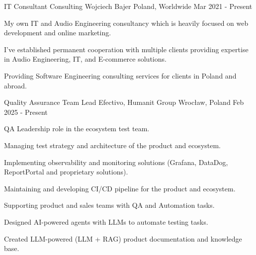 
\begin{cventries}

  \cventry
  {IT Consultant} %
  {Consulting Wojciech Bajer} %
  {Poland, Worldwide} %
  {Mar 2021 - Present} %
  {
    \begin{cvitems} %
      \item {My own IT and Audio Engineering consultancy which is heavily focused on web development and online marketing.}
      \item {I've established permanent cooperation with multiple clients providing expertise in Audio Engineering, IT, and E-commerce solutions.}
      \item {Providing Software Engineering consulting services for clients in Poland and abroad.}
    \end{cvitems}
  }

  \cventry
  {Quality Assurance Team Lead} %
  {Efectivo, Humanit Group} %
  {Wrocław, Poland} %
  {Feb 2025 - Present} %
  {
    \begin{cvitems}
      \item {QA Leadership role in the ecosystem test team.}
      \item {Managing test strategy and architecture of the product and ecosystem.}
      \item {Implementing observability and monitoring solutions (Grafana, DataDog, ReportPortal and proprietary solutions).}
      \item {Maintaining and developing CI/CD pipeline for the product and ecosystem.}
      \item {Supporting product and sales teams with QA and Automation tasks.}
      \item {Designed AI-powered agents with LLMs to automate testing tasks.}
      \item {Created LLM-powered (LLM + RAG) product documentation and knowledge base.}   
    \end{cvitems}
  }


\end{cventries}
